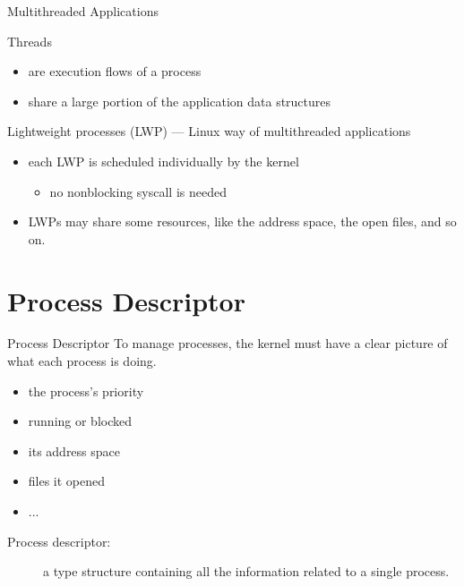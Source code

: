 \begin{frame}{Multithreaded Applications}
  \begin{block}{Threads}
    \begin{itemize}
    \item are execution flows of a process
    \item share a large portion of the application data structures
    \end{itemize}
  \end{block}
  \begin{block}{Lightweight processes (LWP) --- Linux way of multithreaded
      applications}
    \begin{itemize}
    \item each LWP is scheduled individually by the kernel
      \begin{itemize}
      \item no nonblocking syscall is needed
      \end{itemize}
    \item LWPs may share some resources, like the address space, the
      open files, and so on.
    \end{itemize}
  \end{block}
\end{frame}

\section{Process Descriptor}
\label{sec:process-descriptor}

\begin{frame}{Process Descriptor}
  To manage processes, the kernel must have a clear picture of what each process is doing.
  \begin{itemize}
  \item the process's priority
  \item running or blocked
  \item its address space
  \item files it opened
  \item ...
  \end{itemize}
  \begin{description}
  \item[Process descriptor:] a  type structure containing
    all the information related to a single process.
  \end{description}
  \begin{center}
  \end{center}
\end{frame}

